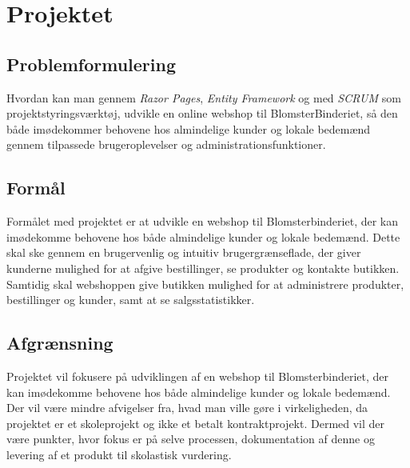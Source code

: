 \section{Projektet}

\subsection{Problemformulering}
Hvordan kan man gennem \emph{Razor Pages}, \emph{Entity Framework} og med \emph{SCRUM} som projektstyringsværktøj, udvikle en online webshop til BlomsterBinderiet, 
så den både imødekommer behovene hos almindelige kunder og lokale bedemænd gennem tilpassede brugeroplevelser og administrationsfunktioner.

\subsection{Formål}
Formålet med projektet er at udvikle en webshop til Blomsterbinderiet, der kan imødekomme behovene hos både almindelige kunder og lokale bedemænd. 
Dette skal ske gennem en brugervenlig og intuitiv brugergrænseflade, der giver kunderne mulighed for at afgive bestillinger, se produkter og kontakte butikken. 
Samtidig skal webshoppen give butikken mulighed for at administrere produkter, bestillinger og kunder, samt at se salgsstatistikker.

\subsection{Afgrænsning}
Projektet vil fokusere på udviklingen af en webshop til Blomsterbinderiet, der kan imødekomme behovene hos både almindelige kunder og lokale bedemænd. 
Der vil være mindre afvigelser fra, hvad man ville gøre i virkeligheden, da projektet er et skoleprojekt og ikke et betalt kontraktprojekt. 
Dermed vil der være punkter, hvor fokus er på selve processen, dokumentation af denne og levering af et produkt til skolastisk vurdering.

